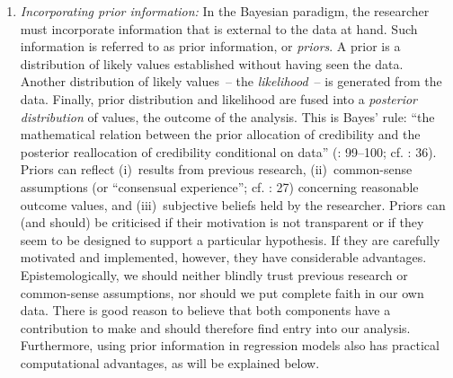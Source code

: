 \begin{enumerate}
\item \textit{Incorporating prior information:} In the Bayesian paradigm, the researcher must incorporate information that is external to the data at hand. Such information is referred to as prior information, or \textit{priors}. A prior is a distribution of likely values established without having seen the data. Another distribution of likely values~– the \textit{likelihood}~– is generated from the data. Finally, prior distribution and likelihood are fused into a \textit{posterior distribution} of values, the outcome of the analysis. This is Bayes’ rule: “the mathematical relation between the prior allocation of credibility and the posterior reallocation of credibility conditional on data” (\citealt{Kruschke2015}: 99–100; cf. \citealt{Shikano2015}: 36). Priors can reflect
(i)~results from previous research,
(ii)~common-sense assumptions (or “consensual experience”; cf. \citealt{Kruschke2015}: 27) concerning reasonable outcome values, and
(iii)~subjective beliefs held by the researcher. Priors can (and should) be criticised if their motivation is not transparent or if they seem to be designed to support a particular hypothesis. If they are carefully motivated and implemented, however, they have considerable advantages. Epistemologically, we should neither blindly trust previous research or common-sense assumptions, nor should we put complete faith in our own data. There is good reason to believe that both components have a contribution to make and should therefore find entry into our analysis. Furthermore, using prior information in regression models also has practical computational advantages, as will be explained below.


\end{enumerate}
